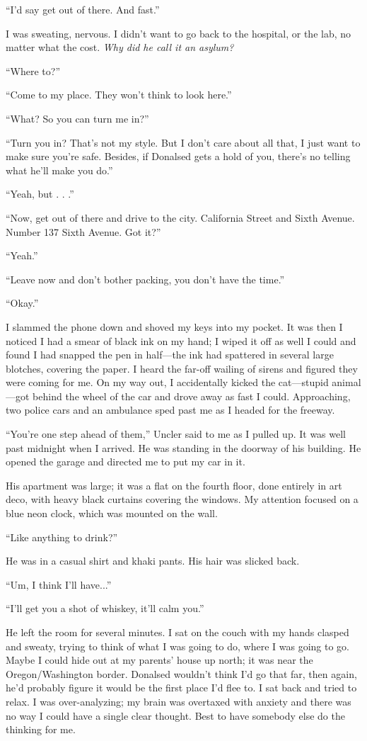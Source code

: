 ``I'd say get out of there. And fast.''

I was sweating, nervous. I didn't want to go back to the hospital, or
the lab, no matter what the cost. \emph{Why did he call it an asylum?}

``Where to?''

``Come to my place. They won't think to look here.''

``What? So you can turn me in?''

``Turn you in? That's not my style. But I don't care about all that, I
just want to make sure you're safe. Besides, if Donalsed gets a hold of
you, there's no telling what he'll make you do.''

``Yeah, but . . .''

``Now, get out of there and drive to the city. California Street and
Sixth Avenue. Number 137 Sixth Avenue. Got it?''

``Yeah.''

``Leave now and don't bother packing, you don't have the time.''

``Okay.''

I slammed the phone down and shoved my keys into my pocket. It was then
I noticed I had a smear of black ink on my hand; I wiped it off as well
I could and found I had snapped the pen in half---the ink had spattered
in several large blotches, covering the paper. I heard the far-off
wailing of sirens and figured they were coming for me. On my way out, I
accidentally kicked the cat---stupid animal---got behind the wheel of
the car and drove away as fast I could. Approaching, two police cars and
an ambulance sped past me as I headed for the freeway.

``You're one step ahead of them,'' Uncler said to me as I pulled up. It
was well past midnight when I arrived. He was standing in the doorway of
his building. He opened the garage and directed me to put my car in it.

His apartment was large; it was a flat on the fourth floor, done
entirely in art deco, with heavy black curtains covering the windows. My
attention focused on a blue neon clock, which was mounted on the wall.

``Like anything to drink?''

He was in a casual shirt and khaki pants. His hair was slicked back.

``Um, I think I'll have...''

``I'll get you a shot of whiskey, it'll calm you.''

He left the room for several minutes. I sat on the couch with my hands
clasped and sweaty, trying to think of what I was going to do, where I
was going to go. Maybe I could hide out at my parents' house up north;
it was near the Oregon/Washington border. Donalsed wouldn't think I'd go
that far, then again, he'd probably figure it would be the first place
I'd flee to. I sat back and tried to relax. I was over-analyzing; my
brain was overtaxed with anxiety and there was no way I could have a
single clear thought. Best to have somebody else do the thinking for me.

